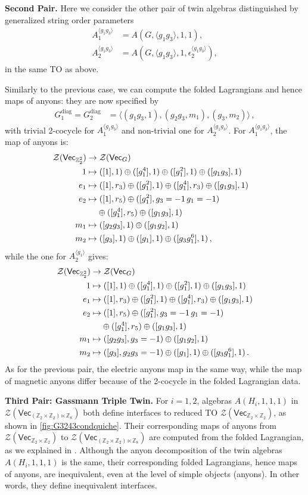 \documentclass[aps,twocolumn,prx,floatfix,preprintnumbers, nofootinbib,10pt]{revtex4-2}
\numberwithin{equation}{section}
\theoremstyle{definition}
\newcommand{\be}{\begin{equation}}
\newcommand{\ee}{\end{equation}}
\newcommand{\ba}{\begin{aligned}}
\newcommand{\ea}{\end{aligned}}
\newcommand{\Z}{{\mathbb Z}}
\newcommand{\cZ}{\mathcal{Z}}
\renewcommand{\Vec}{\mathsf{Vec}}
\newcommand{\diag}{\text{diag}}
\begin{document}
\vspace{2mm}
\noindent\textbf{Second Pair.}
Here we consider the other pair of twin algebras distinguished by generalized string order parameters
\begin{align}
    A_1^{\langle g_1 g_3 \rangle} & = A(G, \langle g_1 g_3 \rangle, 1, 1), \\ 
    A_2^{\langle g_1 g_3 \rangle} & = A(G, \langle g_1 g_3 \rangle, 1, \epsilon^{\langle g_1 g_3 \rangle}_2),
\end{align}
in the same TO as above. 

Similarly to the previous case, we can compute the folded Lagrangians and hence maps of anyons: they are now specified by
\be\ba
    G^\diag_1=G^\diag_2&=\langle (g_1g_3,1), (g_2g_3,m_1), (g_3,m_2) \rangle\,,
\ea\ee 
with trivial 2-cocycle for $A_1^{\langle g_1g_3\rangle}$ and non-trivial one for $A_2^{\langle g_1g_3\rangle}$.
For $A_1^{\langle g_1g_3\rangle}$, the map of anyons is:
\be\ba 
\cZ(\Vec_{\Z_2^2}) & \rightarrow \cZ(\Vec_G) \cr
1  &\mapsto  ([1],1) \oplus ([g_1^4],1) \oplus ([g_1^2], 1) \oplus ([g_1g_3],1)\cr
e_1  &\mapsto  ([1],r_3) \oplus ([g_1^2],1) \oplus ([g_1^4],r_3) \oplus ([g_1g_3],1)\cr
e_2  &\mapsto  ([1],r_5) \oplus ([g_1^2],g_3=-1\,g_1=-1) \cr
&\quad\; \oplus ([g_1^4], r_5) \oplus ([g_1g_3],1)\cr
m_1  &\mapsto   ([g_2g_3],1) \oplus ([g_1g_2],1)\cr
m_2  &\mapsto  ([g_3],1) \oplus ([g_1],1) \oplus ([g_3g_1^6],1) \,,
\ea\ee
while the one for  $A_2^{\langle g_1\rangle} $ gives:
\be\ba 
\cZ(\Vec_{\Z_2^2}) & \rightarrow \cZ(\Vec_G) \cr
1  &\mapsto  ([1],1) \oplus ([g_1^4],1) \oplus ([g_1^2], 1) \oplus ([g_1g_3],1)\cr
e_1  &\mapsto  ([1],r_3) \oplus ([g_1^2],1) \oplus ([g_1^4],r_3) \oplus ([g_1g_3],1)\cr
e_2  &\mapsto  ([1],r_5) \oplus ([g_1^2],g_3=-1\,g_1=-1) \\
& \quad\; \oplus ([g_1^4], r_5) \oplus ([g_1g_3],1)\cr
m_1  &\mapsto  ([g_2g_3], g_3=-1) \oplus ([g_1g_2],1)\cr
m_2  &\mapsto   ([g_3],g_2g_3=-1)\oplus ([g_1],1)\oplus ([g_3g_1^6],1)\,.
\ea\ee
As for the previous pair, the electric anyons map in the same way, while the map of magnetic anyons differ because of the 2-cocycle in the folded Lagrangian data.

\vspace{2mm}
\noindent\textbf{Third Pair: Gassmann Triple Twin.}
For $i=1,2$, algebras $A(H_i,1,1,1)$ in ${\cZ(\Vec_{(\Z_2 \times \Z_2) \ltimes \Z_8})}$ both define interfaces to reduced TO $\cZ(\Vec_{\Z_2\times\Z_2})$, as shown in \eqref{fig:G3243condquiche}. Their corresponding maps of anyons from $\cZ(\Vec_{\Z_2\times\Z_2})$ to ${\cZ(\Vec_{(\Z_2 \times \Z_2) \ltimes \Z_8})}$ are computed from the folded Lagrangian, as we explained in . Although the anyon decomposition of the twin algebras $A(H_i,1,1,1)$ is the same, their corresponding folded Lagrangians, hence maps of anyons, are inequivalent, even at the level of simple objects (anyons). In other words, they define inequivalent interfaces.
\end{document}
